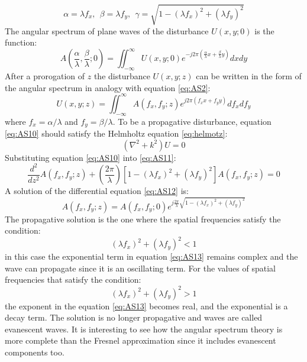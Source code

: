 \begin{equation}
\label{eq:AS8}
\alpha=\lambda f_x, \ \ \beta=\lambda f_y, \ \ \gamma = \sqrt{1-(\lambda f_x)^2+(\lambda f_y)^2}
\end{equation}
The angular spectrum of plane waves of the disturbance $U(x,y;0)$ is the function:
\begin{equation}
\label{eq:AS9}
A\left(\frac{\alpha}{\lambda},\frac{\beta}{\lambda};0\right)=\iint_{-\infty}^{\infty} U(x,y;0)e^{-j2\pi(\frac{\alpha}{\lambda} x+\frac{\beta}{\lambda} y)}dx dy
\end{equation}
After a prorogation of $z$ the disturbance $U(x,y;z)$ can be written in the form of the angular spectrum in analogy with equation \ref{eq:AS2}:
\begin{equation}
\label{eq:AS10}
U(x,y;z)=\iint_{-\infty}^{\infty} A(f_x,f_y;z)e^{j2\pi(f_x x+f_y y)}df_x df_y
\end{equation}
where $f_x=\alpha/\lambda$ and $f_y=\beta/\lambda$.
To be a propagative disturbance, equation \ref{eq:AS10} should satisfy the Helmholtz equation \ref{eq:helmotz}:
\begin{equation}
\label{eq:AS11}
(\nabla^2+k^2)U=0	
\end{equation}
Substituting equation \ref{eq:AS10} into \ref{eq:AS11}:
 \begin{equation}
 \label{eq:AS12}
\dfrac{d^2}{dz^2}A(f_x,f_y;z)+\left(\dfrac{2\pi}{\lambda}\right)[1-(\lambda f_x)^2 + (\lambda f_y)^2 ]A(f_x,f_y;z)=0
 \end{equation}
 A solution of the differential equation \ref{eq:AS12} is:
 \begin{equation}
 \label{eq:AS13}
 A(f_x,f_y;z)=A(f_x,f_y;0)e^{j \frac{2\pi}{\lambda}\sqrt{1-(\lambda f_x)^2+(\lambda f_y)^2}}
 \end{equation}
 The propagative solution is the one where the spatial frequencies satisfy the condition:
 \begin{equation}
 \label{eq:AS14}
 (\lambda f_x)^2+(\lambda f_y)^2<1
 \end{equation}
 in this case the exponential term in equation \ref{eq:AS13} remains complex and the wave can propagate since it is an oscillating term. For the values of spatial frequencies that satisfy the condition:
 \begin{equation}
 \label{eq:AS15}
 (\lambda f_x)^2+(\lambda f_y)^2>1
 \end{equation}
 the exponent in the equation \ref{eq:AS13} becomes real, and the exponential is a decay term. The solution is no longer propagative and waves are called evanescent waves. It is interesting to see how the angular spectrum theory is more complete than the Fresnel approximation since it includes evanescent components too.\\

